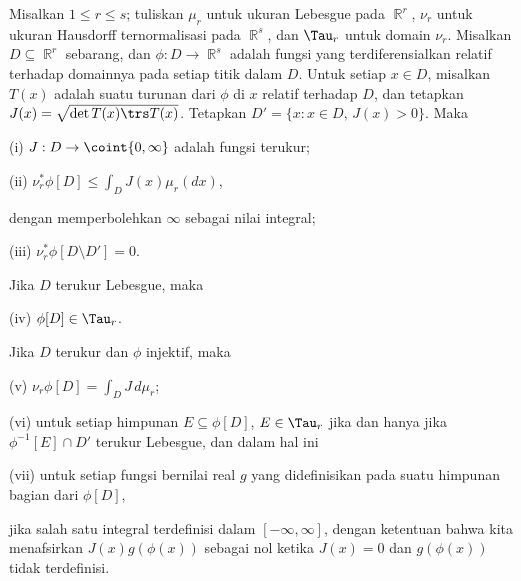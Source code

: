  Misalkan $1\le r\le s$; tuliskan $\mu_r$ untuk
ukuran Lebesgue pada $\BbbR^r$, $\nu_r$ untuk ukuran Hausdorff
ternormalisasi pada $\BbbR^s$, dan $\Tau_r$ untuk domain $\nu_r$.
Misalkan $D\subseteq\BbbR^r$ sebarang, dan
$\phi:D\to\BbbR^s$ adalah fungsi yang terdiferensialkan relatif terhadap
domainnya pada setiap titik dalam $D$. Untuk setiap $x\in D$, misalkan $T(x)$
adalah suatu turunan dari $\phi$ di $x$ relatif terhadap $D$, dan
tetapkan $J(x)=\sqrt{\det T(x)\trs T(x)}$.
Tetapkan $D'=\{x:x\in D,\,J(x)>0\}$. Maka

\quad (i) $J:D\to\coint{0,\infty}$ adalah fungsi terukur;

\quad (ii) $\nu_r^*\phi[D]\le\int_DJ(x)\mu_r(dx)$,

\noindent dengan memperbolehkan $\infty$ sebagai nilai integral;

\quad (iii) $\nu_r^*\phi[D\setminus D']=0$.

\noindent Jika $D$ terukur Lebesgue, maka

\quad (iv) $\phi[D]\in\Tau_r$.

\noindent Jika $D$ terukur dan $\phi$ injektif, maka

\quad (v) $\nu_r\phi[D]=\int_DJ\,d\mu_r$;

\quad (vi) untuk setiap himpunan $E\subseteq\phi[D]$, $E\in\Tau_r$
jika dan hanya jika $\phi^{-1}[E]\cap D'$ terukur Lebesgue, dan
dalam hal ini


\quad (vii) untuk setiap fungsi bernilai real $g$ yang didefinisikan
pada suatu himpunan bagian dari $\phi[D]$,


\noindent jika salah satu integral terdefinisi dalam
$[-\infty,\infty]$, dengan ketentuan bahwa kita menafsirkan
$J(x)g(\phi(x))$ sebagai nol ketika $J(x)=0$ dan $g(\phi(x))$ tidak
terdefinisi.

